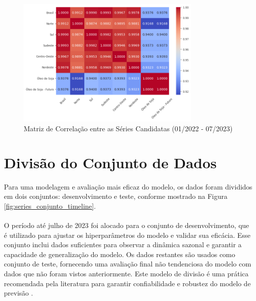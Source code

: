 \begin{figure}
	\begin{center}
		\begin{center}
			\includegraphics[width=0.8\textwidth]{figuras/correlation_matrix.png}
			\caption{Matriz de Correlação entre as Séries Candidatas (01/2022 - 07/2023)}
			\label{fig:correlation_matrix}
		\end{center}

	\end{center}
\end{figure}

\section{Divisão do Conjunto de Dados}
\paragraph{} Para uma modelagem e avaliação mais eficaz do modelo, os dados foram divididos em dois conjuntos: desenvolvimento e teste, conforme mostrado na Figura \ref{fig:series_conjunto_timeline}.
\paragraph{} O período até julho de 2023 foi alocado para o conjunto de desenvolvimento, que é utilizado para ajustar os hiperparâmetros do modelo e validar sua eficácia. Esse conjunto inclui dados suficientes para observar a dinâmica sazonal e garantir a capacidade de generalização do modelo. Os dados restantes são usados como conjunto de teste, fornecendo uma avaliação final não tendenciosa do modelo com dados que não foram vistos anteriormente. Este modelo de divisão é uma prática recomendada pela literatura para garantir confiabilidade e robustez do modelo de previsão \cite{saha2024}.

